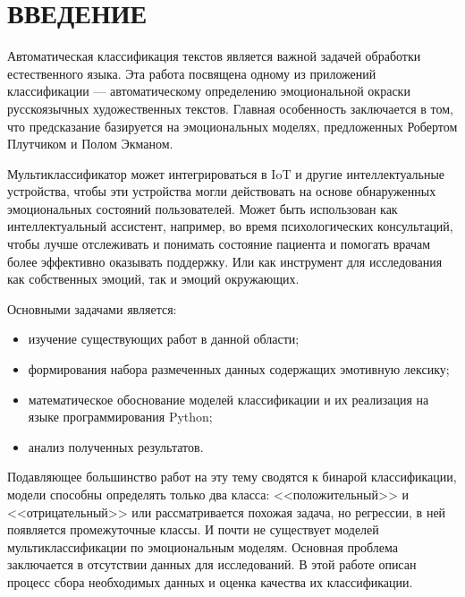 \chapter*{ВВЕДЕНИЕ}
\vspace*{-0.5cm}


Автоматическая классификация текстов является важной задачей обработки естественного языка. Эта работа посвящена одному из приложений классификации --- автоматическому определению эмоциональной окраски русскоязычных художественных текстов. Главная особенность заключается в том, что предсказание базируется на эмоциональных моделях, предложенных Робертом Плутчиком и Полом Экманом.

\bigskip
Мультиклассификатор может интегрироваться в IoT и другие интеллектуальные устройства, чтобы эти устройства могли действовать на основе обнаруженных эмоциональных состояний пользователей. Может быть использован как интеллектуальный ассистент, например, во время психологических консультаций, чтобы лучше отслеживать и понимать состояние пациента и помогать врачам более эффективно оказывать поддержку. Или как инструмент для исследования как собственных эмоций, так и эмоций окружающих.

\bigskip\noindent
Основными задачами является:

\begin{itemize}
 \item изучение существующих работ в данной области;
 \item формирования набора размеченных данных содержащих эмотивную лексику;
 \item математическое обоснование моделей классификации и их реализация на языке программирования Python;
 \item анализ полученных результатов.
\end{itemize}

\bigskip
Подавляющее большинство работ на эту тему сводятся к бинарой классификации, модели способны определять только два класса: <<положительный>> и <<отрицательный>> или рассматривается похожая задача, но регрессии, в ней появляется промежуточные классы. И почти не существует моделей мультиклассификации по эмоциональным моделям. Основная проблема заключается в отсутствии данных для исследований. В этой работе описан процесс сбора необходимых данных и оценка качества их классификации.

